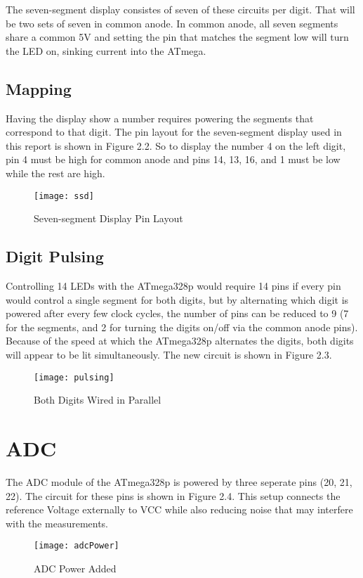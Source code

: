 \documentclass[main.tex]{subfiles}
\begin{document}
		The seven-segment display consistes of seven of these circuits per digit. That will be two sets
		of seven in common anode. In common anode, all seven segments share a common 5V and setting the
		pin that matches the segment low will turn the LED on, sinking current into the ATmega.
		
		
		\subsection{Mapping}
		Having the display show a number requires powering the segments that correspond to that digit.
		The pin layout for the seven-segment display used in this report is shown in Figure 2.2.
		So to display the number 4 on the left digit, pin 4 must be high for common anode and pins
		14, 13, 16, and 1 must be low while the rest are high.
		\begin{figure}[H]
			\begin{center}
				\texttt{[image: ssd]}
			\end{center}
			\caption{Seven-segment Display Pin Layout}
			\label{fig:sevenSegment}
		\end{figure}
		
		\subsection{Digit Pulsing}
		Controlling 14 LEDs with the ATmega328p would require 14 pins if every pin would control a single
		segment for both digits, but by alternating which digit is powered after every few clock cycles,
		the number of pins can be reduced to 9 (7 for the segments, and 2 for turning the digits on/off
		via the common anode pins). Because of the speed at which the ATmega328p alternates the digits,
		both digits will appear to be lit simultaneously. The new circuit is shown in Figure 2.3.
		\begin{figure}[H]
			\begin{center}
				\texttt{[image: pulsing]}
			\end{center}
			\caption{Both Digits Wired in Parallel}
			\label{fig:pulse}
		\end{figure}
		
	\section{ADC}
	The ADC module of the ATmega328p is powered by three seperate pins (20, 21, 22). The circuit for
	these pins is shown in Figure 2.4. This setup connects the reference Voltage externally to 
	VCC while also reducing noise that may interfere with the measurements.
	\begin{figure}[H]
		\begin{center}
			\texttt{[image: adcPower]}
		\end{center}
		\caption{ADC Power Added}
		\label{fig:adcPwr}
	\end{figure}
\end{document}
